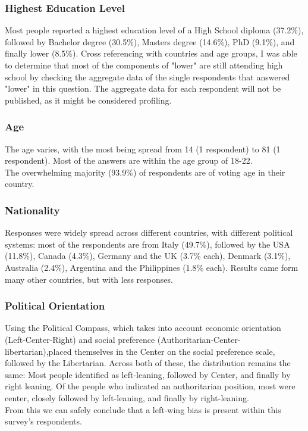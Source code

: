 \documentclass{article}
\begin{document}
\subsubsection{Highest Education Level} %
\label{subsub:Highest Education Level}
Most people reported a highest education level of a High School diploma (37.2\%), followed by Bachelor degree (30.5\%), Masters degree (14.6\%), PhD (9.1\%), and finally lower (8.5\%). Cross referencing with countries and age groups, I was able to determine that most of the components of "lower" are still attending high school by checking the aggregate data of the single respondents that answered "lower" in this question. The aggregate data for each respondent will not be published, as it might be considered profiling.
\subsubsection{Age} %
\label{subsub:Age}
The age varies, with the most being spread from 14 (1 respondent) to 81 (1 respondent). Most of the answers are within the age group of 18-22.\\
The overwhelming majority (93.9\%) of respondents are of voting age in their country.
\subsubsection{Nationality} %
\label{subsub:Nationality}
Responses were widely spread across different countries, with different political systems: most of the respondents are from Italy (49.7\%), followed by the USA (11.8\%), Canada (4.3\%), Germany and the UK (3.7\% each), Denmark (3.1\%), Australia (2.4\%), Argentina and the Philippines (1.8\% each). Results came form many other countries, but with less responses.
\subsubsection{Political Orientation} %
\label{subsub:Political Orientation}
Using the Political Compass, which takes into account economic orientation (Left-Center-Right) and social preference (Authoritarian-Center-libertarian),placed themselves in the Center on the social preference scale, followed by the Libertarian. Across both of these, the distribution remains the same: Most people identified as left-leaning, followed by Center, and finally by right leaning. Of the people who indicated an authoritarian position, most were center, closely followed by left-leaning, and finally by right-leaning.\\
From this we can safely conclude that a left-wing bias is present within this survey's respondents.
\end{document}
